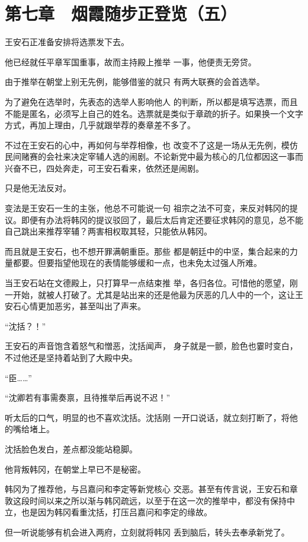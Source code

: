 \section{第七章　烟霞随步正登览（五）}

王安石正准备安排将选票发下去。

他已经就任平章军国重事，故而主持殿上推举 一事，他便责无旁贷。

由于推举在朝堂上别无先例，能够借鉴的就只 有两大联赛的会首选举。

为了避免在选举时，先表态的选举人影响他人 的判断，所以都是填写选票，而且不能是匿名，必须写上自己的姓名。选票就是类似于章疏的折子。如果换一个文字方式，再加上理由，几乎就跟举荐的奏章差不多了。

不过在王安石的心中，再如何与举荐相像，也 改变不了这是一场从无先例，模仿民间赌赛的会社来决定宰辅人选的闹剧。不论新党中最为核心的几位都因这一事而兴奋不已，四处奔走，可王安石看来，依然还是闹剧。

只是他无法反对。

变法是王安石一生的主张，他总不可能说一句 祖宗之法不可变，来反对韩冈的提议。即便有办法将韩冈的提议驳回了，最后太后肯定还要征求韩冈的意见，总不能自己跳出来推荐宰辅？两害相权取其轻，只能依从韩冈。

而且就是王安石，也不想开罪满朝重臣。那些 都是朝廷中的中坚，集合起来的力量都要。但要指望他现在的表情能够缓和一点，也未免太过强人所难。

当王安石站在文德殿上，只打算早一点结束推 举，各归各位。可惜他的愿望，刚一开始，就被人打破了。尤其是站出来的还是他最为厌恶的几人中的一个，这让王安石心情更加恶劣，甚至叫出了声来。

“沈括？！”

王安石的声音饱含着怒气和憎恶，沈括闻声， 身子就是一颤，脸色也霎时变白，不过他还是坚持着站到了大殿中央。

“臣……”

“沈卿若有事需奏禀，且待推举后再说不迟！”

听太后的口气，明显的也不喜欢沈括。沈括刚 一开口说话，就立刻打断了，将他的嘴给堵上。

沈括脸色发白，差点都没能站稳脚。

他背叛韩冈，在朝堂上早已不是秘密。

韩冈为了推荐他，与吕嘉问和李定等新党核心 交恶。甚至有传言说，王安石和章敦这段时间以来之所以渐与韩冈疏远，以至于在这一次的推举中，都没有保持中立，也是因为韩冈看重沈括，打压吕嘉问和李定的缘故。

但一听说能够有机会进入两府，立刻就将韩冈 丢到脑后，转头去奉承新党了。

